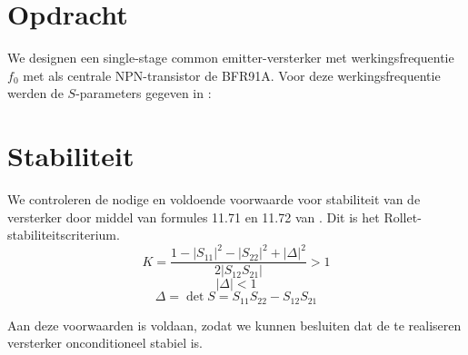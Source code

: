 \section{Opdracht}
    We designen een single-stage common emitter-versterker met werkingsfrequentie $f_0$
    met als centrale NPN-transistor de BFR91A. Voor deze werkingsfrequentie werden
    de $S$-parameters gegeven in \cite{lesWendy}: 
    
    
\section{Stabiliteit}
  
    We controleren de nodige en voldoende voorwaarde voor stabiliteit van de versterker door middel van formules 11.71 en 11.72 van \cite{Pozar}. Dit is het Rollet-stabiliteitscriterium.
    \[
      K = \frac{1 - \left| S_{11} \right|^2 - \left| S_{22} \right|^2 + \left| \Delta \right|^2}{2 \left| S_{12}S_{21} \right|} > 1
    \]
    \[
      \left| \Delta \right| < 1
    \]
    \[
      \Delta = \det{S} = S_{11}S_{22} - S_{12}S_{21}
    \]
    
    Aan deze voorwaarden is voldaan, zodat we kunnen besluiten dat de te realiseren versterker onconditioneel stabiel is.
